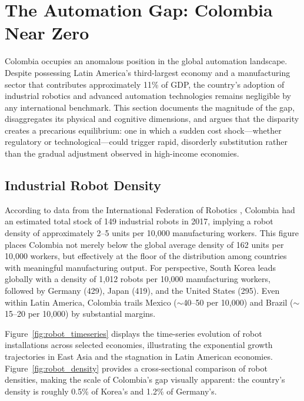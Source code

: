 \documentclass{article}
\begin{document}
\section{The Automation Gap: Colombia Near Zero}
\label{sec:automation_gap}

Colombia occupies an anomalous position in the global automation landscape. Despite possessing Latin America's third-largest economy and a manufacturing sector that contributes approximately 11\% of GDP, the country's adoption of industrial robotics and advanced automation technologies remains negligible by any international benchmark. This section documents the magnitude of the gap, disaggregates its physical and cognitive dimensions, and argues that the disparity creates a precarious equilibrium: one in which a sudden cost shock---whether regulatory or technological---could trigger rapid, disorderly substitution rather than the gradual adjustment observed in high-income economies.

\subsection{Industrial Robot Density}
\label{subsec:robot_density}

According to data from the International Federation of Robotics \cite{ifr2024}, Colombia had an estimated total stock of 149 industrial robots in 2017, implying a robot density of approximately 2--5 units per 10,000 manufacturing workers. This figure places Colombia not merely below the global average density of 162 units per 10,000 workers, but effectively at the floor of the distribution among countries with meaningful manufacturing output. For perspective, South Korea leads globally with a density of 1,012 robots per 10,000 manufacturing workers, followed by Germany (429), Japan (419), and the United States (295). Even within Latin America, Colombia trails Mexico ($\sim$40--50 per 10,000) and Brazil ($\sim$15--20 per 10,000) by substantial margins.

Figure~\ref{fig:robot_timeseries} displays the time-series evolution of robot installations across selected economies, illustrating the exponential growth trajectories in East Asia and the stagnation in Latin American economies. Figure~\ref{fig:robot_density} provides a cross-sectional comparison of robot densities, making the scale of Colombia's gap visually apparent: the country's density is roughly 0.5\% of Korea's and 1.2\% of Germany's.
\end{document}
